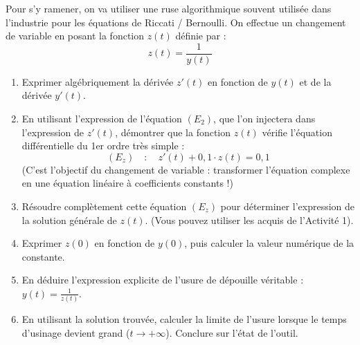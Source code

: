 \documentclass[a4paper,11pt]{article}
\begin{document}
Pour s'y ramener, on va utiliser une ruse algorithmique souvent utilisée dans l'industrie pour les équations de Riccati / Bernoulli. On effectue un changement de variable en posant la fonction $z(t)$ définie par :
\[
z(t) = \frac{1}{y(t)}
\]

\begin{enumerate}
    \item Exprimer algébriquement la dérivée $z'(t)$ en fonction de $y(t)$ et de la dérivée $y'(t)$.
    
    \vspace{3cm}
    
    \item En utilisant l'expression de l'équation $(E_2)$, que l'on injectera dans l'expression de $z'(t)$, démontrer que la fonction $z(t)$ vérifie l'équation différentielle du 1er ordre très simple :
    \[
    (E_{z}) \quad : \quad z'(t) + 0,1 \cdot z(t) = 0,1
    \]
    (C'est l'objectif du changement de variable : transformer l'équation complexe en une équation linéaire à coefficients constants !)
    
    \vspace{5cm}
    
    \item Résoudre complètement cette équation $(E_{z})$ pour déterminer l'expression de la solution générale de $z(t)$. (Vous pouvez utiliser les acquis de l'Activité 1).
    
    \vspace{5cm}
    
    \item Exprimer $z(0)$ en fonction de $y(0)$, puis calculer la valeur numérique de la constante.
    
    \vspace{3cm}
    
    \item En déduire l'expression explicite de l'usure de dépouille véritable : $y(t) = \frac{1}{z(t)}$.
    
    \vspace{3cm}
    
    \item En utilisant la solution trouvée, calculer la limite de l'usure lorsque le temps d'usinage devient grand ($t \to +\infty$). Conclure sur l'état de l'outil.
\end{enumerate}

\newpage

\end{document}
